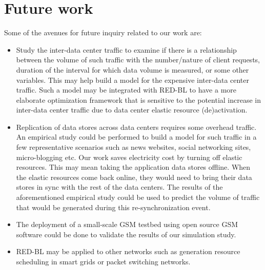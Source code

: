 \section{Future work} Some of the avenues for future inquiry related to our work are:

\begin{itemize}
\item Study the inter-data center traffic to examine if there is a relationship between the volume of such traffic with the number/nature of client requests, duration of the interval for which data volume is measured, or some other variables. This may help build a model for the expensive inter-data center traffic. Such a model may be integrated with RED-BL to have a more elaborate optimization framework that is sensitive to the potential increase in inter-data center traffic due to data center elastic resource (de)activation.
\item Replication of data stores across data centers requires some overhead traffic. An empirical study could be performed to build a model for such traffic in a few representative scenarios such as news websites, social networking sites, micro-blogging etc. Our work saves electricity cost by turning off elastic resources. This may mean taking the application data stores offline. When the elastic resources come back online, they would need to bring their data stores in sync with the rest of the data centers. The results of the aforementioned empirical study could be used to predict the volume of traffic that would be generated during this re-synchronization event.
\item The deployment of a small-scale GSM testbed using open source GSM software could be done to validate the results of our simulation study.
\item RED-BL may be applied to other networks such as generation resource scheduling in smart grids or packet switching networks.
\end{itemize}
